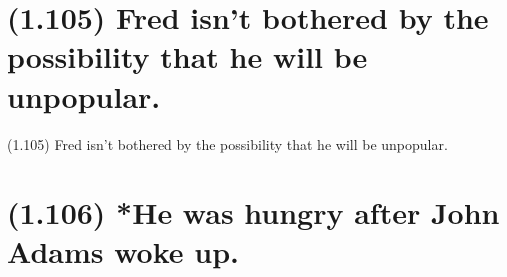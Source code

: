 \documentclass{article}
\begin{document}
\bigbreak
\begin{minipage}{\textwidth}
\end{minipage}
\bigbreak

\clearpage

%
%

\section*{(1.105) Fred isn't bothered by the possibility that he will be unpopular.}

\bigbreak
\begin{enumerate*}
\item[(1.105)] Fred isn't bothered by the possibility that he will be unpopular.
\end{enumerate*}
\bigbreak

\bigbreak
\begin{minipage}{\textwidth}
\end{minipage}
\bigbreak

\clearpage

%
%

\section*{(1.106) *He was hungry after John Adams woke up.}
\end{document}
